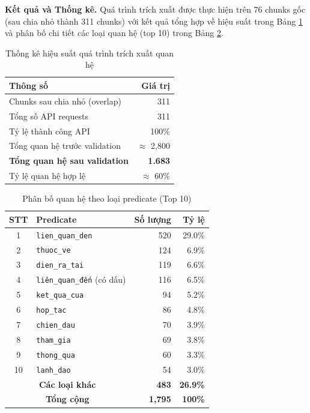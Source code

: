\noindent \textbf{Kết quả và Thống kê.} Quá trình trích xuất được thực hiện trên 76 chunks gốc (sau chia nhỏ thành 311 chunks) với kết quả tổng hợp về hiệu suất trong Bảng \ref{tab:relation_extraction_stats} và phân bố chi tiết các loại quan hệ (top 10) trong Bảng \ref{tab:relation_distribution}.

\begin{table}[H]
\centering
\caption{Thống kê hiệu suất quá trình trích xuất quan hệ}
\label{tab:relation_extraction_stats}
\begin{tabular}{|l|r|}
\hline
\textbf{Thông số} & \textbf{Giá trị} \\
\hline
Chunks sau chia nhỏ (overlap) & 311 \\
Tổng số API requests & 311 \\
Tỷ lệ thành công API & 100\% \\
\hline
Tổng quan hệ trước validation & $\approx$ 2,800 \\
\textbf{Tổng quan hệ sau validation} & \textbf{1.683} \\
Tỷ lệ quan hệ hợp lệ & $\approx$ 60\% \\
\hline
\end{tabular}
\end{table}

\begin{table}[H]
\centering
\caption{Phân bố quan hệ theo loại predicate (Top 10)}
\label{tab:relation_distribution}
\begin{tabular}{|c|l|r|r|}
\hline
\textbf{STT} & \textbf{Predicate} & \textbf{Số lượng} & \textbf{Tỷ lệ} \\
\hline
1 & \texttt{lien\_quan\_den} & 520 & 29.0\% \\
2 & \texttt{thuoc\_ve} & 124 & 6.9\% \\
3 & \texttt{dien\_ra\_tai} & 119 & 6.6\% \\
4 & \texttt{liên\_quan\_đến} (có dấu) & 116 & 6.5\% \\
5 & \texttt{ket\_qua\_cua} & 94 & 5.2\% \\
6 & \texttt{hop\_tac} & 86 & 4.8\% \\
7 & \texttt{chien\_dau} & 70 & 3.9\% \\
8 & \texttt{tham\_gia} & 69 & 3.8\% \\
9 & \texttt{thong\_qua} & 60 & 3.3\% \\
10 & \texttt{lanh\_dao} & 54 & 3.0\% \\
\hline
\multicolumn{2}{|c|}{\textbf{Các loại khác}} & \textbf{483} & \textbf{26.9\%} \\
\hline
\multicolumn{2}{|c|}{\textbf{Tổng cộng}} & \textbf{1,795} & \textbf{100\%} \\
\hline
\end{tabular}
\end{table}

